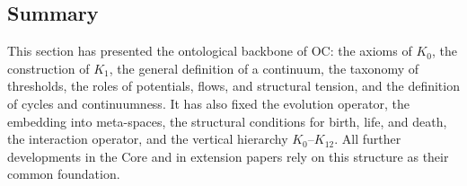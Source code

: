 \subsection{Summary}

This section has presented the ontological backbone of OC:
the axioms of \(K_0\), the construction of \(K_1\), the general definition of a continuum,
the taxonomy of thresholds, the roles of potentials, flows, and structural tension,
and the definition of cycles and continuumness.
It has also fixed the evolution operator, the embedding into meta-spaces, the
structural conditions for birth, life, and death, the interaction operator, and
the vertical hierarchy \(K_0\)–\(K_{12}\).
All further developments in the Core and in extension papers rely on this structure as their common foundation.
